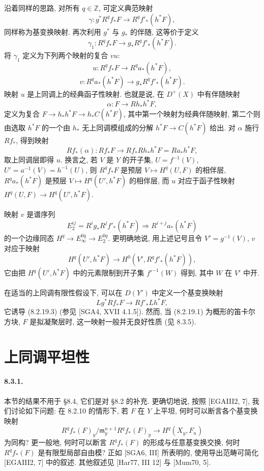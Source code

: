 沿着同样的思路, 对所有 $q\in\mathbb Z$, 可定义典范映射
\begin{equation}\gamma:g^*R^qf_*F\longrightarrow R^qf'_*(h^*F),\tag{8.2.19.3}\label{ch08:eq82193}\end{equation}
同样称为基变换映射. 再次利用 $g^*$ 与 $g_*$ 的伴随, 这等价于定义
\[\gamma_1:R^qf_*F\longrightarrow g_*R^qf'_*(h^*F).\]
将 $\gamma_1$ 定义为下列两个映射的复合 $vu$:
\[u:R^qf_*F\longrightarrow R^qa_*(h^*F),\]
\[v:R^qa_*(h^*F)\longrightarrow g_*R^qf'_*(h^*F).\]
映射 $u$ 是上同调上的经典函子性映射. 也就是说, 在 $D^+(X)$ 中有伴随映射
\[\alpha:F\longrightarrow Rh_*h^*F,\]
定义为复合 $F\to h_*h^*F\to h_*C(h^*F)$, 其中第一个映射为经典伴随映射, 第二个则由选取 $h^*F$ 的一个由 $h_*$ 无上同调模组成的分解 $h^*F\to C(h^*F)$ 给出. 对 $\alpha$ 施行 $Rf_*$, 得到映射
\[Rf_*(\alpha):Rf_*F\longrightarrow Rf_*Rh_*h^*F=Ra_*h^*F,\]
取上同调层即得 $u$. 换言之, 若 $V$ 是 $Y$ 的开子集, $U=f^{-1}(V)$, $U'=a^{-1}(V)=h^{-1}(U)$, 则 $R^qf_*F$ 是预层 $V\mapsto H^q(U,F)$ 的相伴层, $R^qa_*(h^*F)$ 是预层 $V\mapsto H^q(U',h^*F)$ 的相伴层, 而 $u$ 对应于函子性映射 $H^q(U,F)\to H^q(U',h^*F)$.

映射 $v$ 是谱序列
\[E_2^{ij}=R^ig_*R^jf'_*(h^*F)\Longrightarrow R^{i+j}a_*(h^*F)\]
的一个边缘同态 $H^q\to E_\infty^{0q}\to E_2^{0q}$. 更明确地说, 用上述记号且令 $V'=g^{-1}(V)$, $v$ 对应于映射
\[H^q(U',h^*F)\longrightarrow H^0(V',R^qf'_*(h^*F)),\]
它由把 $H^q(U',h^*F)$ 中的元素限制到开子集 $f'^{-1}(W)$ 得到, 其中 $W$ 在 $V'$ 中开.

在适当的上同调有限性假设下, 可以在 $D(Y')$ 中定义一个基变换映射
\begin{equation}Lg^*Rf_*F\longrightarrow Rf'_*Lh^*F,\tag{8.2.19.4}\label{ch08:eq82194}\end{equation}
它诱导 (8.2.19.3) (参见 [SGA4, XVII 4.1.5]). 然而, 当 (8.2.19.1) 为概形的笛卡尔方块, $F$ 是拟凝聚层时, 这一映射一般并无良好性质 (见 8.3.5).

\section{上同调平坦性}\label{ch08:sec83}
\paragraph{8.3.1.}
本节的结果不用于 §8.4, 它们是对 §8.2 的补充. 更确切地说, 按照 [EGAIII2, 7], 我们讨论如下问题: 在 8.2.10 的情形下, 若 $F$ 在 $Y$ 上平坦, 何时可以断言各个基变换映射
\[R^qf_*(F)_y/\mathfrak m_y^{n+1}R^qf_*(F)_y\longrightarrow H^q(X_y,F_n)\]
为同构? 更一般地, 何时可以断言 $R^qf_*(F)$ 的形成与任意基变换交换, 何时 $R^qf_*(F)$ 是有限型局部自由模? 正如 [SGA6, III] 所表明的, 使用导出范畴可简化 [EGAIII2, 7] 中的叙述. 其他叙述见 [Har77, III 12] 与 [Mum70, 5].

